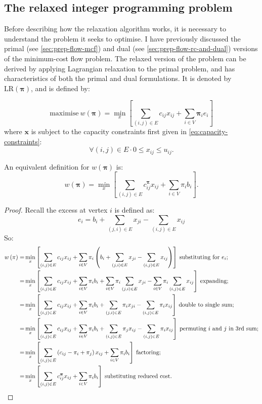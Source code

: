 \subsection{The relaxed integer programming problem}
Before describing how the relaxation algorithm works, it is necessary to understand the problem it seeks to optimise. I have previously discussed the primal (see \cref{sec:prep-flow-mcf}) and dual (see \cref{sec:prep-flow-rc-and-dual}) versions of the minimum-cost flow problem. The relaxed version of the problem can be derived by applying Lagrangian relaxation to the primal problem, and has characteristics of both the primal and dual formulations. It is denoted by $\mathrm{LR}(\boldsymbol{\pi})$, and is defined by:

\begin{equation} \label{eq:relax-obj-fun-excess}
\mathrm{maximise}\: w\left(\boldsymbol{\pi}\right)=\min_{x}\left[\sum_{\left(i,j\right)\in E}c_{ij}x_{ij}+\sum_{i\in V}\boldsymbol{\pi}_{i}e_{i}\right]
\end{equation}
where $\mathbf{x}$ is subject to the capacity constraints first given in \cref{eq:capacity-constraints}:
\[\forall\left(i,j\right)\in E\cdot 0\leq x_{ij}\leq u_{ij}.\]

\begin{lemma}
An equivalent definition for $w(\boldsymbol{\pi})$ is:
\begin{equation} \label{eq:relax-obj-fun-balance}
w(\boldsymbol{\pi})=\min_{x}\left[\sum_{\left(i,j\right)\in E}c_{ij}^{\boldsymbol{\pi}}x_{ij}+\sum_{i\in V}\pi_{i}b_{i}\right].
\end{equation}
\end{lemma}
\begin{proof}
Recall the excess at vertex $i$ is defined as:
\[e_{i}=b_{i}+\sum_{(j,i)\in E}x_{ji}-\sum_{(i,j)\in E}x_{ij}\]
So:
\begin{align*}
w\left(\pi\right)= & \min_{x}\left[\sum_{\left(i,j\right)\in E}c_{ij}x_{ij}+\sum_{i\in V}\pi_{i}\left(b_{i}+\sum_{(j,i)\in E}x_{ji}-\sum_{(i,j)\in E}x_{ij}\right)\right]\:\mbox{substituting for }e_{i};\\
= & \min_{x}\left[\sum_{\left(i,j\right)\in E}c_{ij}x_{ij}+\sum_{i\in V}\pi_{i}b_{i}+\sum_{i\in V}\pi_{i}\sum_{(j,i)\in E}x_{ji}-\sum_{i\in V}\pi_{i}\sum_{(i,j)\in E}x_{ij}\right]\:\mbox{expanding;}\\
= & \min_{x}\left[\sum_{\left(i,j\right)\in E}c_{ij}x_{ij}+\sum_{i\in V}\pi_{i}b_{i}+\sum_{(j,i)\in E}\pi_{i}x_{ji}-\sum_{(i,j)\in E}\pi_{i}x_{ij}\right]\:\mbox{double to single sum;}\\
= & \min_{x}\left[\sum_{\left(i,j\right)\in E}c_{ij}x_{ij}+\sum_{i\in V}\pi_{i}b_{i}+\sum_{(i,j)\in E}\pi_{j}x_{ij}-\sum_{(i,j)\in E}\pi_{i}x_{ij}\right]\:\mbox{permuting \ensuremath{i} and \ensuremath{j} in 3rd sum;}\\
= & \min_{x}\left[\sum_{\left(i,j\right)\in E}\left(c_{ij}-\pi_{i}+\pi_{j}\right)x_{ij}+\sum_{i\in V}\pi_{i}b_{i}\right]\:\mbox{factoring;}\\
= & \min_{x}\left[\sum_{\left(i,j\right)\in E}c_{ij}^{\boldsymbol{\pi}}x_{ij}+\sum_{i\in V}\pi_{i}b_{i}\right]\:\mbox{substituting reduced cost.}
\end{align*}
\end{proof}

